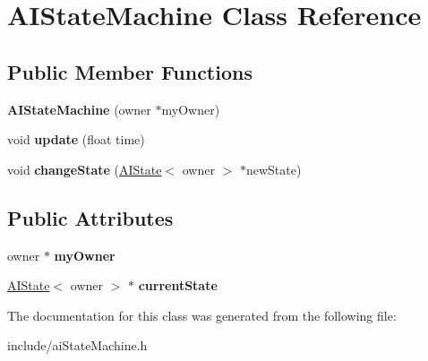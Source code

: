 \hypertarget{classAIStateMachine}{
\section{\-A\-I\-State\-Machine \-Class \-Reference}
\label{d9/d1c/classAIStateMachine}
}
\subsection*{\-Public \-Member \-Functions}
\begin{DoxyCompactItemize}
\item 
\hypertarget{classAIStateMachine_a2023f50e6e747d8ef7705eb319f721f4}{
{\bfseries \-A\-I\-State\-Machine} (owner $\ast$my\-Owner)}
\label{d9/d1c/classAIStateMachine_a2023f50e6e747d8ef7705eb319f721f4}

\item 
\hypertarget{classAIStateMachine_a30c26a06d4cce1d8796c278f80295609}{
void {\bfseries update} (float time)}
\label{d9/d1c/classAIStateMachine_a30c26a06d4cce1d8796c278f80295609}

\item 
\hypertarget{classAIStateMachine_a8be4aa47e9de39245f601b5ce1e4182b}{
void {\bfseries change\-State} (\hyperlink{classAIState}{\-A\-I\-State}$<$ owner $>$ $\ast$new\-State)}
\label{d9/d1c/classAIStateMachine_a8be4aa47e9de39245f601b5ce1e4182b}

\end{DoxyCompactItemize}
\subsection*{\-Public \-Attributes}
\begin{DoxyCompactItemize}
\item 
\hypertarget{classAIStateMachine_ad3a15246f414faecd4a778fd9c9d23e1}{
owner $\ast$ {\bfseries my\-Owner}}
\label{d9/d1c/classAIStateMachine_ad3a15246f414faecd4a778fd9c9d23e1}

\item 
\hypertarget{classAIStateMachine_a7870f2857a12ac9acd1d71616492f46c}{
\hyperlink{classAIState}{\-A\-I\-State}$<$ owner $>$ $\ast$ {\bfseries current\-State}}
\label{d9/d1c/classAIStateMachine_a7870f2857a12ac9acd1d71616492f46c}

\end{DoxyCompactItemize}


\-The documentation for this class was generated from the following file\-:\begin{DoxyCompactItemize}
\item 
include/ai\-State\-Machine.\-h\end{DoxyCompactItemize}
